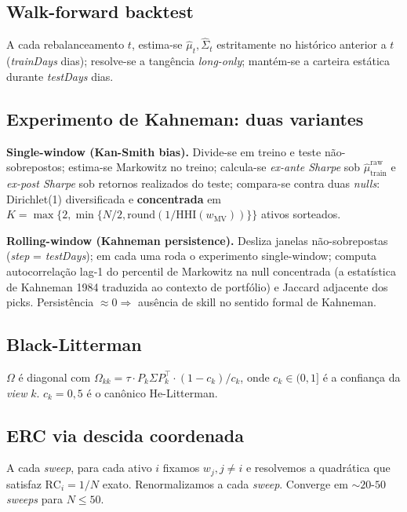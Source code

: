 \documentclass[12pt,a4paper,oneside]{article}
\begin{document}
\subsection{Walk-forward backtest}

A cada rebalanceamento $t$, estima-se $\hat{\mu}_t, \hat{\Sigma}_t$
estritamente no histórico anterior a $t$ (\textit{trainDays} dias);
resolve-se a tangência \textit{long-only}; mantém-se a carteira
estática durante \textit{testDays} dias.

\subsection{Experimento de Kahneman: duas variantes}

\textbf{Single-window (Kan-Smith bias).} Divide-se em treino e teste
não-sobrepostos; estima-se Markowitz no treino; calcula-se
\textit{ex-ante Sharpe} sob $\hat{\mu}^{\text{raw}}_{\text{train}}$
e \textit{ex-post Sharpe} sob retornos realizados do teste; compara-se
contra duas \textit{nulls}: Dirichlet(1) diversificada e
\textbf{concentrada} em $K = \max\{2, \min\{N/2, \mathrm{round}(1/\mathrm{HHI}(w_{\text{MV}}))\}\}$
ativos sorteados.

\textbf{Rolling-window (Kahneman persistence).} Desliza janelas
não-sobrepostas (\textit{step} = \textit{testDays}); em cada uma roda
o experimento single-window; computa autocorrelação lag-1 do
percentil de Markowitz na null concentrada (a estatística de
Kahneman 1984 traduzida ao contexto de portfólio) e Jaccard
adjacente dos picks. Persistência $\approx 0 \Rightarrow$ ausência de skill no
sentido formal de Kahneman.

\subsection{Black-Litterman}

$\Omega$ é diagonal com $\Omega_{kk} = \tau \cdot P_k \Sigma P_k^\top
\cdot (1 - c_k)/c_k$, onde $c_k \in (0, 1]$ é a confiança da
\textit{view} $k$. $c_k = 0{,}5$ é o canônico He-Litterman.

\subsection{ERC via descida coordenada}

A cada \textit{sweep}, para cada ativo $i$ fixamos $w_j, j \neq i$ e
resolvemos a quadrática que satisfaz $\mathrm{RC}_i = 1/N$ exato.
Renormalizamos a cada \textit{sweep}. Converge em $\sim 20$-$50$
\textit{sweeps} para $N \leq 50$.
\end{document}
